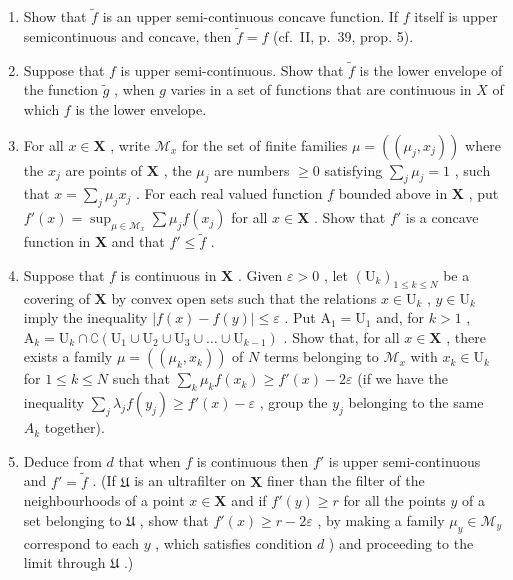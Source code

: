 \begin{enumerate}
\def\labelenumi{\alph{enumi})}
\item
  Show that \(\tilde{f}\) is an upper semi-continuous concave function. If \(f\) itself is upper semicontinuous and concave, then \(\tilde{f} = f\) (cf.~II, p.~39, prop. 5).
\item
  Suppose that \(f\) is upper semi-continuous. Show that \(\tilde{f}\) is the lower envelope of the function \(\tilde{g}\) , when \(g\) varies in a set of functions that are continuous in \(X\) of which \(f\) is the lower envelope.
\item
  For all \(x \in \mathbf{X}\) , write \(\mathcal{M}_x\) for the set of finite families \(\mu = ((\mu_j, x_j))\) where the \(x_j\) are points of \(\mathbf{X}\) , the \(\mu_j\) are numbers \(\geqslant 0\) satisfying \(\sum_j \mu_j = 1\) , such that \(x = \sum_j \mu_j x_j\) . For each real valued function \(f\) bounded above in \(\mathbf{X}\) , put \(f'(x) = \sup_{\mu \in \mathcal{M}_x} \sum \mu_j f(x_j)\) for all \(x \in \mathbf{X}\) . Show that \(f'\) is a concave function in \(\mathbf{X}\) and that \(f' \leqslant \tilde{f}\) .
\item
  Suppose that \(f\) is continuous in \(\mathbf{X}\) . Given \(\varepsilon > 0\) , let \((\mathrm{U}_k)_{1 \leqslant k \leqslant N}\) be a covering of \(\mathbf{X}\) by convex open sets such that the relations \(x \in \mathrm{U}_k\) , \(y \in \mathrm{U}_k\) imply the inequality \(|f(x) - f(y)| \leqslant \varepsilon\) . Put \(\mathrm{A}_1 = \mathrm{U}_1\) and, for \(k > 1\) , \(\mathrm{A}_k = \mathrm{U}_k \cap \complement(\mathrm{U}_1 \cup \mathrm{U}_2 \cup \mathrm{U}_3 \cup \ldots \cup \mathrm{U}_{k-1})\) . Show that, for all \(x \in \mathbf{X}\) , there exists a family \(\mu = ((\mu_k, x_k))\) of \(N\) terms belonging to \(\mathcal{M}_x\) with \(x_k \in \mathrm{U}_k\) for \(1 \leqslant k \leqslant N\) such that \(\sum_k \mu_k f(x_k) \geqslant f'(x) - 2\varepsilon\) (if we have the inequality \(\sum_j \lambda_j f(y_j) \geqslant f'(x) - \varepsilon\) , group the \(y_j\) belonging to the same \(A_k\) together).
\item
  Deduce from \(d\) that when \(f\) is continuous then \(f'\) is upper semi-continuous and \(f' = \tilde{f}\) . (If \(\mathfrak{U}\) is an ultrafilter on \(\mathbf{X}\) finer than the filter of the neighbourhoods of a point \(x \in \mathbf{X}\) and if \(f'(y) \geqslant r\) for all the points \(y\) of a set belonging to \(\mathfrak{U}\) , show that \(f'(x) \geqslant r - 2\varepsilon\) , by making a family \(\mu_y \in \mathcal{M}_y\) correspond to each \(y\) , which satisfies condition \(d\) ) and proceeding to the limit through \(\mathfrak{U}\) .)
\end{enumerate}

